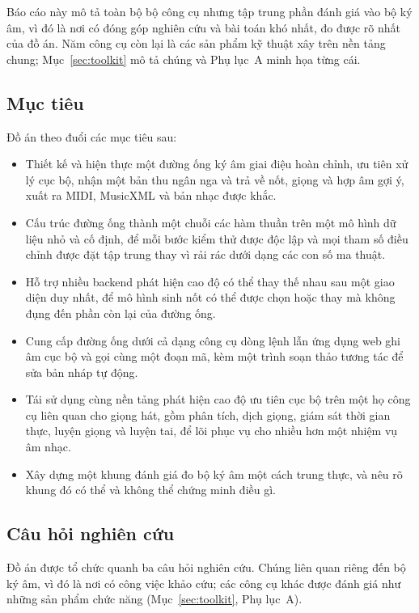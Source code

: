 \documentclass[12pt,a4paper]{article}
\begin{document}
Báo cáo này mô tả toàn bộ bộ công cụ nhưng tập trung phần đánh giá vào bộ ký âm, vì
đó là nơi có đóng góp nghiên cứu và bài toán khó nhất, đo được rõ nhất của đồ án.
Năm công cụ còn lại là các sản phẩm kỹ thuật xây trên nền tảng chung;
Mục~\ref{sec:toolkit} mô tả chúng và Phụ lục~A minh họa từng cái.

\subsection{Mục tiêu}

Đồ án theo đuổi các mục tiêu sau:

\begin{itemize}
    \item Thiết kế và hiện thực một đường ống ký âm giai điệu hoàn chỉnh, ưu tiên
    xử lý cục bộ, nhận một bản thu ngân nga và trả về nốt, giọng và hợp âm gợi ý,
    xuất ra MIDI, MusicXML và bản nhạc được khắc.
    \item Cấu trúc đường ống thành một chuỗi các hàm thuần trên một mô hình dữ liệu
    nhỏ và cố định, để mỗi bước kiểm thử được độc lập và mọi tham số điều chỉnh
    được đặt tập trung thay vì rải rác dưới dạng các con số ma thuật.
    \item Hỗ trợ nhiều backend phát hiện cao độ có thể thay thế nhau sau một giao
    diện duy nhất, để mô hình sinh nốt có thể được chọn hoặc thay mà không đụng đến
    phần còn lại của đường ống.
    \item Cung cấp đường ống dưới cả dạng công cụ dòng lệnh lẫn ứng dụng web ghi âm
    cục bộ và gọi cùng một đoạn mã, kèm một trình soạn thảo tương tác để sửa bản
    nháp tự động.
    \item Tái sử dụng cùng nền tảng phát hiện cao độ ưu tiên cục bộ trên một họ
    công cụ liên quan cho giọng hát, gồm phân tích, dịch giọng, giám sát thời gian
    thực, luyện giọng và luyện tai, để lõi phục vụ cho nhiều hơn một nhiệm vụ âm
    nhạc.
    \item Xây dựng một khung đánh giá đo bộ ký âm một cách trung thực, và nêu rõ
    khung đó có thể và không thể chứng minh điều gì.
\end{itemize}

\subsection{Câu hỏi nghiên cứu}

Đồ án được tổ chức quanh ba câu hỏi nghiên cứu. Chúng liên quan riêng đến bộ ký âm,
vì đó là nơi có công việc khảo cứu; các công cụ khác được đánh giá như những sản
phẩm chức năng (Mục~\ref{sec:toolkit}, Phụ lục~A).
\end{document}
